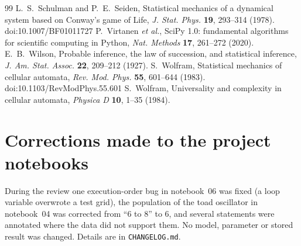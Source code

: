 \documentclass[11pt,a4paper]{article}
\begin{document}
\begin{thebibliography}{99}
 L.~S.~Schulman and P.~E.~Seiden, Statistical mechanics of a dynamical system based on Conway's game of Life, \emph{J. Stat. Phys.} \textbf{19}, 293--314 (1978). doi:10.1007/BF01011727
 P.~Virtanen \emph{et al.}, SciPy 1.0: fundamental algorithms for scientific computing in Python, \emph{Nat. Methods} \textbf{17}, 261--272 (2020).
 E.~B.~Wilson, Probable inference, the law of succession, and statistical inference, \emph{J. Am. Stat. Assoc.} \textbf{22}, 209--212 (1927).
 S.~Wolfram, Statistical mechanics of cellular automata, \emph{Rev. Mod. Phys.} \textbf{55}, 601--644 (1983). doi:10.1103/RevModPhys.55.601
 S.~Wolfram, Universality and complexity in cellular automata, \emph{Physica D} \textbf{10}, 1--35 (1984).
\end{thebibliography}

\appendix
\section{Corrections made to the project notebooks}

During the review one execution-order bug in notebook~06 was fixed (a loop variable overwrote a test grid), the population of the toad oscillator in notebook~04 was corrected from ``6 to 8'' to 6, and several statements were annotated where the data did not support them. No model, parameter or stored result was changed. Details are in \texttt{CHANGELOG.md}.
\end{document}
